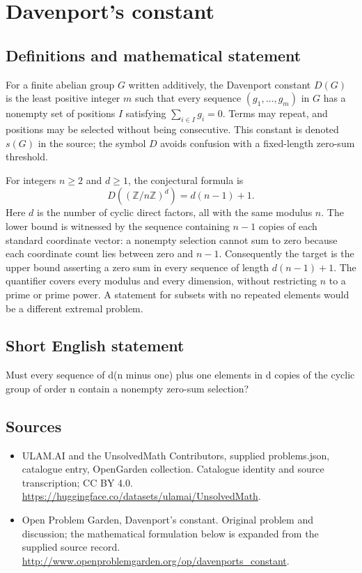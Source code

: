 \documentclass[11pt,a4paper]{article}
\begin{document}
\section*{Davenport's constant}\label{statement}

\subsection{Definitions and mathematical statement}
For a finite abelian group $G$ written additively, the Davenport
constant $D(G)$ is the least positive integer $m$ such that every
sequence $(g_1,\ldots,g_m)$ in $G$ has a nonempty set of positions
$I$ satisfying $\sum_{i\in I}g_i=0$. Terms may repeat, and positions
may be selected without being consecutive. This constant is denoted
$s(G)$ in the source; the symbol $D$ avoids confusion with a
fixed-length zero-sum threshold.

For integers $n\ge2$ and $d\ge1$, the conjectural formula is
\[
              D((\mathbb Z/n\mathbb Z)^d)=d(n-1)+1.
\]
Here $d$ is the number of cyclic direct factors, all with the same
modulus $n$. The lower bound is witnessed by the sequence containing
$n-1$ copies of each standard coordinate vector: a nonempty selection
cannot sum to zero because each coordinate count lies between zero
and $n-1$. Consequently the target is the upper bound asserting a
zero sum in every sequence of length $d(n-1)+1$.
The quantifier covers every modulus and every dimension, without
restricting $n$ to a prime or prime power. A statement for subsets
with no repeated elements would be a different extremal problem.
\subsection{Short English statement}
Must every sequence of d(n minus one) plus one elements in d copies of the cyclic group of order n contain a nonempty zero-sum selection?
\subsection{Sources}
\begin{itemize}
\item[S1] ULAM.AI and the UnsolvedMath Contributors, supplied problems.json, catalogue entry, OpenGarden collection. Catalogue identity and source transcription; CC BY 4.0.
\url{https://huggingface.co/datasets/ulamai/UnsolvedMath}.
\item[S2] Open Problem Garden, Davenport's constant. Original problem and discussion; the mathematical formulation below is expanded from the supplied source record.
\url{http://www.openproblemgarden.org/op/davenports_constant}.
\end{itemize}
\end{document}
